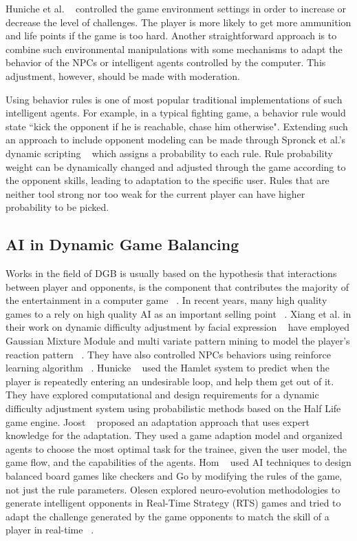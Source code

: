 Huniche et al. ~\cite{hunicke2004ai} controlled the game environment settings in order to increase or decrease the level of challenges. The player is more likely to get more ammunition and life points if the game is too hard. Another straightforward approach is to combine such environmental manipulations with some mechanisms to adapt the behavior of the NPCs or intelligent agents controlled by the computer. This adjustment, however, should be made with moderation.

Using behavior rules is one of most popular traditional implementations of such intelligent agents. For example, in a typical fighting game, a behavior rule would state ``kick the opponent if he is reachable, chase him otherwise". Extending such an approach to include opponent modeling can be made through Spronck et al.'s dynamic scripting ~\cite{spronck2004difficulty} which assigns a probability to each rule. Rule probability weight can be dynamically changed and adjusted through the game according to the opponent skills, leading to adaptation to the specific user. Rules that are neither tool strong nor too weak for the current player can have higher probability to be picked.

\subsection{AI in Dynamic Game Balancing}
Works in the field of DGB is usually based on the hypothesis that interactions between player and opponents, is the component that contributes the majority of the entertainment in a computer game ~\cite{schaalevolving}. In recent years, many high quality games to a rely on high quality AI as an important selling point ~\cite{forbus2002ai}. Xiang et al. in their work on dynamic difficulty adjustment by facial expression ~\cite{xiang2013dynamic} have employed Gaussian Mixture Module and multi variate pattern mining to model the player's reaction pattern ~\cite{lee2006dynamic, chiu2008using}. They have also controlled NPCs behaviors using reinforce learning algorithm ~\cite{spronck2004difficulty, andrade2005challenge}. Hunicke ~\cite{hunicke2004ai} used the Hamlet system to predict when the player is repeatedly entering an undesirable loop, and help them get out of it. They have explored computational and design requirements for a dynamic difficulty adjustment system using probabilistic methods based on the Half Life game engine. Joost ~\cite{westra2009adaptive} proposed an adaptation approach that uses expert knowledge for the adaptation. They used a game adaption model and organized agents to choose the most optimal task for the trainee, given the user model, the game flow, and the capabilities of the agents. Hom ~\cite{hom2007automatic} used AI techniques to design balanced board games like checkers and Go by modifying the rules of the game, not just the rule parameters. Olesen explored neuro-evolution methodologies to generate intelligent opponents in Real-Time Strategy (RTS) games and tried to adapt the challenge generated by the game opponents to match the skill of a player in real-time ~\cite{olesen2008real}.

